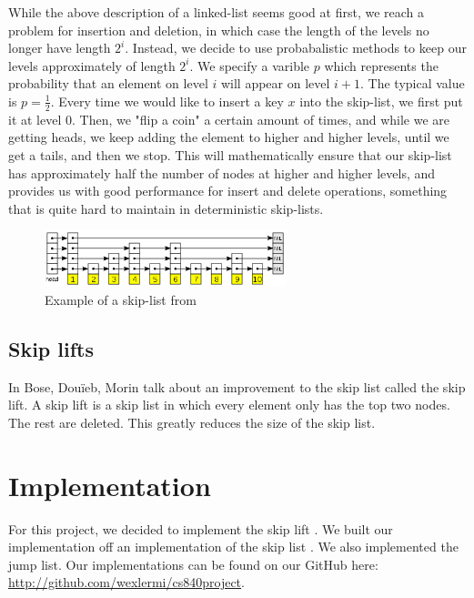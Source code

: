 \documentclass[oribibl]{llncs}
\begin{document}
While the above description of a linked-list seems good at first, we reach a problem for insertion and deletion, in which case the length of the levels no longer have length $2^i$. Instead, we decide to use probabalistic methods to keep our levels approximately of length $2^i$. We specify a varible $p$ which represents the probability that an element on level $i$ will appear on level $i+1$. The typical value is $p=\frac{1}{2}$. Every time we would like to insert a key $x$ into the skip-list, we first put it at level 0. Then, we "flip a coin" a certain amount of times, and while we are getting heads, we keep adding the element to higher and higher levels, until we get a tails, and then we stop. This will mathematically ensure that our skip-list has approximately half the number of nodes at higher and higher levels, and provides us with good performance for insert and delete operations, something that is quite hard to maintain in deterministic skip-lists.

\begin{figure}[here]
\center
\includegraphics[width=7cm]{skip_list}
\caption{Example of a skip-list from \cite{skip_list}}
\label{fig:skip_list}
\end{figure}

\subsection{Skip lifts}

In \cite{skip_lift} Bose, Douïeb, Morin talk about an improvement to the skip list called the skip lift. A skip lift is a skip list in which every element only has the top two nodes. The rest are deleted. This greatly reduces the size of the skip list.

\section{Implementation}
\label{sctn:implementation}

For this project, we decided to implement the skip lift \cite{skip_lift}. We built our implementation off an implementation of the skip list \cite{skip_list_imp}. We also implemented the jump list\cite{jump_list}.  Our implementations can be found on our GitHub here: \url{http://github.com/wexlermi/cs840project}.
\end{document}
